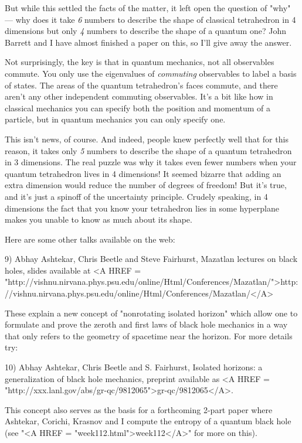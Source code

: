 But while this settled the facts of the matter, it left open the
question of "why" --- why does it take \emph{6} 
numbers to describe the
shape of classical tetrahedron in 4 dimensions but only \emph{4} numbers
to describe the shape of a quantum one?  John Barrett and I have 
almost finished a paper on this, so I'll give away the answer.

Not surprisingly, the key is that in quantum mechanics, not all
observables commute.   You only use the eigenvalues of \emph{commuting}
observables to label a basis of states.  The areas of the quantum
tetrahedron's faces commute, and there aren't any other independent
commuting observables.  It's a bit like how in classical mechanics
you can specify both the position and momentum of a particle, but
in quantum mechanics you can only specify one.

This isn't news, of course.  And indeed, people knew perfectly well 
that for this reason, it takes only \emph{5} numbers to describe the shape of
a quantum tetrahedron in 3 dimensions.  The real puzzle was why it takes
even fewer numbers when your quantum tetrahedron lives in 4 dimensions! 
It seemed bizarre that adding an extra dimension would reduce the number
of degrees of freedom!  But it's true, and it's just a spinoff of the
uncertainty principle.  Crudely speaking, in 4 dimensions the fact that
you know your tetrahedron lies in some hyperplane makes you unable to
know as much about its shape.

Here are some other talks available on the web:

9) Abhay Ashtekar, Chris Beetle and Steve Fairhurst, Mazatlan lectures 
on black holes, slides available at 
<A HREF = "http://vishnu.nirvana.phys.psu.edu/online/Html/Conferences/Mazatlan/">http://vishnu.nirvana.phys.psu.edu/online/Html/Conferences/Mazatlan/</A>

These explain a new concept of "nonrotating isolated horizon"
which allow one to formulate and prove the zeroth and first laws
of black hole mechanics in a way that only refers to the geometry
of spacetime near the horizon.  For more details try:

10) Abhay Ashtekar, Chris Beetle and S. Fairhurst, Isolated horizons:
a generalization of black hole mechanics, preprint available as
<A HREF = "http://xxx.lanl.gov/abs/gr-qc/9812065">gr-qc/9812065</A>.  

This concept also serves as the basis for a forthcoming 2-part paper
where Ashtekar, Corichi, Krasnov and I compute the entropy of a quantum
black hole (see "<A HREF = "week112.html">week112</A>" for more on this).  

